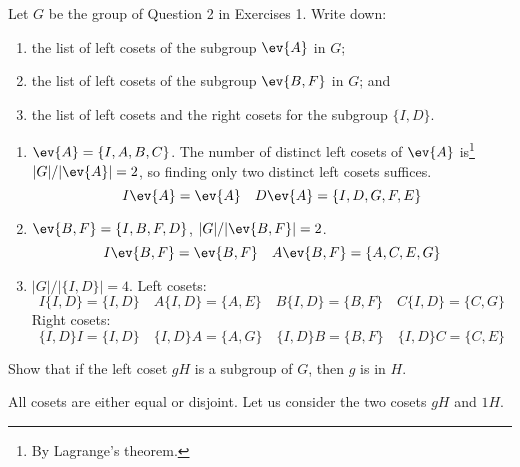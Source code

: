 \begin{exercise}
    Let \(G\) be the group of Question 2 in Exercises 1. Write down:
    \begin{enumerate}
        \item the list of left cosets of the subgroup \(\ev{A}\) in \(G\);
        \item the list of left cosets of the subgroup \(\ev{B, F}\) in \(G\); and
        \item the list of left cosets and the right cosets for the subgroup \(\{I, D\}\).
    \end{enumerate}
\end{exercise}

\begin{solution}\itemfix
    \begin{enumerate}
        \item \(\ev{A} = \{I, A, B, C\}\). The number of distinct left cosets of \(\ev{A}\) is\footnote{By Lagrange's theorem.} \(|G| / |\ev{A}| = 2\), so finding only two distinct left cosets suffices.
              \[I\ev{A} = \ev{A} \quad D\ev{A} = \{I, D, G, F, E\}\]
        \item \(\ev{B, F} = \{I, B, F, D\}\), \(|G| / |\ev{B, F}| = 2\).
              \[I\ev{B, F} = \ev{B, F} \quad A\ev{B, F} = \{A, C, E, G\}\]
        \item \(|G| / |\{I, D\}| = 4\). Left cosets:
              \[I\{I, D\} = \{I, D\} \quad A\{I, D\} = \{A, E\} \quad B\{I, D\} = \{B, F\} \quad C\{I, D\} = \{C, G\}\]
              Right cosets:
              \[\{I, D\}I = \{I, D\} \quad \{I, D\}A = \{A, G\} \quad \{I, D\}B = \{B, F\} \quad \{I, D\}C = \{C, E\}\]
    \end{enumerate}
\end{solution}

\begin{exercise}
    Show that if the left coset \(gH\) is a subgroup of \(G\), then \(g\) is in \(H\).
\end{exercise}
\begin{solution}
    All cosets are either equal or disjoint. Let us consider the two cosets \(gH\) and \(1H\).
    \begin{caseof}
    \end{caseof}
\end{solution}

